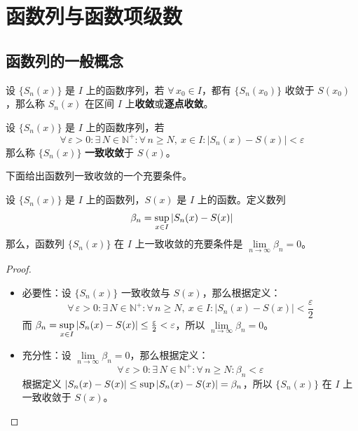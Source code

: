 \section{函数列与函数项级数}

\subsection{函数列的一般概念}

\begin{definition}[函数列的收敛]
    设 $\{S_n(x)\}$ 是 $I$ 上的函数序列，若 $\forall\,x_0 \in I$，都有 $\{S_n(x_0)\}$ 收敛于 $S(x_0)$，那么称 $S_n(x)$ 在区间 $I$ 上\textbf{收敛}或\textbf{逐点收敛}。
\end{definition}

\begin{definition}[函数列的一致收敛]
    设 $\{S_n(x)\}$ 是 $I$ 上的函数序列，若
    $$
    \forall\,\varepsilon > 0: \exists\,N \in \mathbb{N}^{+}: \forall\,n \ge N,\ x \in I: |S_n(x) - S(x)| < \varepsilon
    $$
    那么称 $\{S_n(x)\}$ \textbf{一致收敛}于 $S(x)$。
\end{definition}

下面给出函数列一致收敛的一个充要条件。

\begin{theorem}
    设 $\{S_n(x)\}$ 是 $I$ 上的函数列，$S(x)$ 是 $I$ 上的函数。定义数列
    $$
    \beta_n = \sup_{x \in I} \abs{S_n(x) - S(x)}
    $$
    那么，函数列 $\{S_n(x)\}$ 在 $I$ 上一致收敛的充要条件是 $\lim\limits_{n \to \infty} \beta_n = 0$。

    \begin{proof}
        \begin{itemize}
            \item 必要性：设 $\{S_n(x)\}$ 一致收敛与 $S(x)$，那么根据定义：
            $$
            \forall\,\varepsilon > 0: \exists\,N \in \mathbb{N}^{+}: \forall\,n \ge N,\ x \in I: |S_n(x) - S(x)| < \frac{\varepsilon}{2}
            $$
            而 $\beta_n = \sup\limits_{x \in I} \abs{S_n(x) - S(x)} \le \frac{\varepsilon}{2} < \varepsilon$，所以 $\lim\limits_{n \to \infty} \beta_n = 0$。

            \item 充分性：设 $\lim\limits_{n \to \infty} \beta_n = 0$，那么根据定义：
            $$
            \forall\,\varepsilon > 0: \exists\,N \in \mathbb{N}^{+}: \forall\,n \ge N: \beta_n < \varepsilon
            $$
            根据定义 $\abs{S_n(x) - S(x)} \le \sup \abs{S_n(x) - S(x)} = \beta_n$，所以 $\{S_n(x)\}$ 在 $I$ 上一致收敛于 $S(x)$。
        \end{itemize}
    \end{proof}
\end{theorem}


